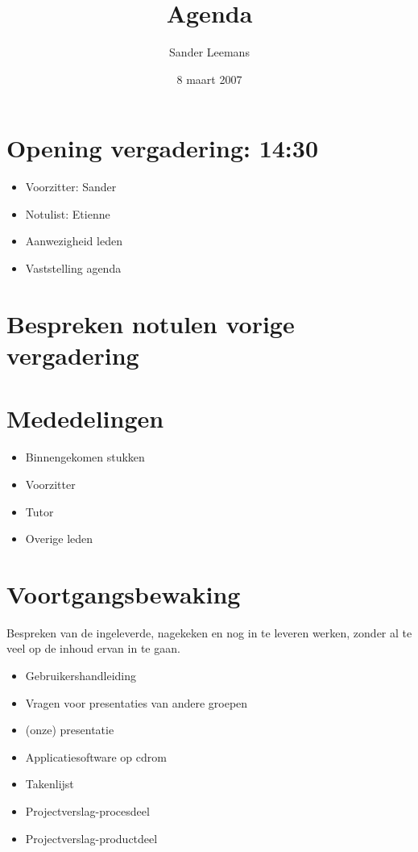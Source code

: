 \documentclass[]{article}
\begin{document}
\title{Agenda}
\author{ Sander Leemans\\ }

\date{8 maart 2007}

\maketitle


\section{Opening vergadering: 14:30}
  \begin{itemize}
      \item Voorzitter: Sander
      \item Notulist: Etienne
      \item Aanwezigheid leden
      \item Vaststelling agenda
  \end{itemize}

\section{Bespreken notulen vorige vergadering}

\section{Mededelingen}
    \begin{itemize}
    \item Binnengekomen stukken
    \item Voorzitter
    \item Tutor
    \item Overige leden
    \end{itemize}

\section{Voortgangsbewaking}
  Bespreken van de ingeleverde, nagekeken en nog in te leveren werken, zonder al te veel op de
  inhoud ervan in te gaan.
  \begin{itemize}
    \item Gebruikershandleiding
    \item Vragen voor presentaties van andere groepen
    \item (onze) presentatie
    \item Applicatiesoftware op cdrom
    \item Takenlijst
    \item Projectverslag-procesdeel
    \item Projectverslag-productdeel
  \end{itemize}
\end{document}
